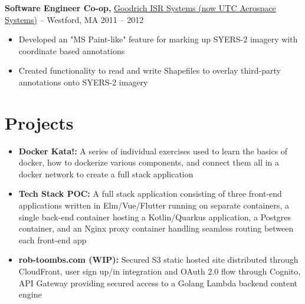 \documentclass[10pt,letterpaper]{article}
\begin{document}
\textbf{Software Engineer Co-op,} \href{https://www.fstl1992.com/}{Goodrich ISR Systems (now UTC Aerospace Systems)} -- Westford, MA \hfill 2011 -- 2012 \\
\vspace{-9pt}
\begin{itemize}
  \item Developed an "MS Paint-like" feature for marking up SYERS-2 imagery with coordinate based annotations
  \item Created functionality to read and write Shapefiles to overlay third-party annotations onto SYERS-2 imagery
\end{itemize}

\vspace{-18.5pt}


 \section*{Projects}
 \begin{itemize}
   \item \textbf{Docker Kata!:} A series of individual exercises used to learn the basics of docker, how to dockerize various components, and connect them all in a docker network to create a full stack application
   \item \textbf{Tech Stack POC:} A full stack application consisting of three front-end applications written in Elm/Vue/Flutter running on separate containers, a single back-end container hosting a Kotlin/Quarkus application, a Postgres container, and an Nginx proxy container handling seamless routing between each front-end app
   \item \textbf{rob-toombs.com (WIP):} Secured S3 static hosted site distributed through CloudFront, user sign up/in integration and OAuth 2.0 flow through Cognito, API Gateway providing secured access to a Golang Lambda backend content engine 
 \end{itemize}

\vspace{-18.5pt}

\end{document}
